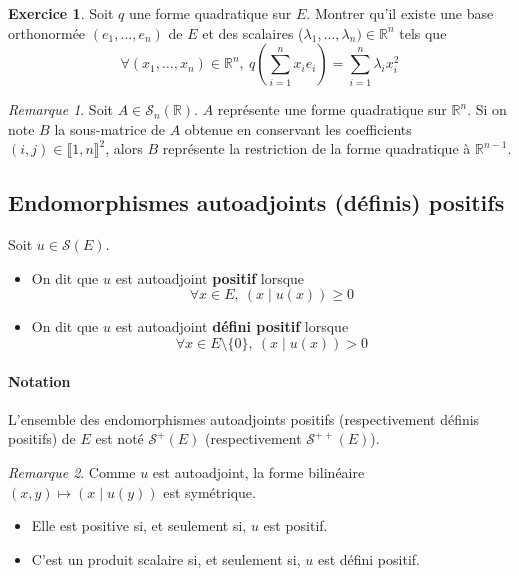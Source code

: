 \documentclass[french]{article}
\newcommand{\R}{\mathbb{R}}
\theoremstyle{plain}
\theoremstyle{definition}
\newtheorem{exo}{Exercice}
\theoremstyle{remark}
\newtheorem*{rmq}{Remarque}
\begin{document}
\begin{exo}
	Soit $q$ une forme quadratique sur $E$. Montrer qu'il existe une base orthonormée $(e_1,\ldots,e_n)$ de $E$ et des scalaires ($\lambda_1,\ldots,\lambda_n)\in\R^n$ tels que $$\forall (x_1,\ldots,x_n)\in\R^n,\ q\left(\sum_{i=1}^{n}x_ie_i\right)=\sum_{i=1}^{n}\lambda_ix_i^2$$
\end{exo}

\begin{rmq}
	Soit $A\in\mathcal{S}_n(\R)$. $A$ représente une forme quadratique sur $\R^n$. Si on note $B$ la sous-matrice de $A$ obtenue en conservant les coefficients $(i,j)\in\llbracket1,n\rrbracket^2$, alors $B$ représente la restriction de la forme quadratique à $\R^{n-1}$.
\end{rmq}

\subsection{Endomorphismes autoadjoints (définis) positifs}

\begin{dfn}
	Soit $u\in\mathcal{S}(E)$.
	\begin{itemize}
		\item On dit que $u$ est autoadjoint \textbf{positif} lorsque $$\forall x\in E,\ (x\mid u(x))\geqslant 0$$
		\item On dit que $u$ est autoadjoint \textbf{défini positif} lorsque $$\forall x\in E\setminus\{0\},\ (x\mid u(x))> 0$$
	\end{itemize}
\end{dfn}

\paragraph{Notation} L'ensemble des endomorphismes autoadjoints positifs (respectivement définis positifs) de $E$ est noté $\mathcal{S}^+(E)$ (respectivement $\mathcal{S}^{++}(E)$).

\begin{rmq}
	Comme $u$ est autoadjoint, la forme bilinéaire $(x,y)\mapsto (x\mid u(y))$ est symétrique.
	\begin{itemize}
		\item Elle est positive si, et seulement si, $u$ est positif.
		\item C'est un produit scalaire si, et seulement si, $u$ est défini positif.
	\end{itemize}
\end{rmq}
\end{document}

